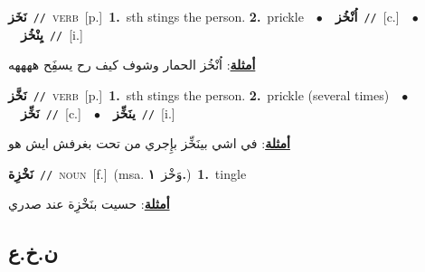 \documentclass[10pt,a4paper,twoside]{article} %
\begin{document}
\begin{multicols}{2}
{\setlength\topsep{0pt}\textbf{\foreignlanguage{arabic}{نَخَز}}\ {\color{gray}\texttt{//}\color{black}}\ \textsc{verb}\ [p.]\ \textbf{1.}~sth stings the person.  \textbf{2.}~prickle\ \ $\bullet$\ \ \setlength\topsep{0pt}\textbf{\foreignlanguage{arabic}{اُنْخُز}}\ {\color{gray}\texttt{//}\color{black}}\ [c.]\ \ $\bullet$\ \ \setlength\topsep{0pt}\textbf{\foreignlanguage{arabic}{يِنْخُز}}\ {\color{gray}\texttt{//}\color{black}}\ [i.]\  \begin{flushright}\color{gray}\foreignlanguage{arabic}{\textbf{\underline{\foreignlanguage{arabic}{أمثلة}}}: اُنْخُز الحمار وشوف كيف رح يسفَِح ههههه}\end{flushright}\color{black}} \vspace{2mm}

{\setlength\topsep{0pt}\textbf{\foreignlanguage{arabic}{نَخَّز}}\ {\color{gray}\texttt{//}\color{black}}\ \textsc{verb}\ [p.]\ \textbf{1.}~sth stings the person.  \textbf{2.}~prickle (several times)\ \ $\bullet$\ \ \setlength\topsep{0pt}\textbf{\foreignlanguage{arabic}{نَخِّز}}\ {\color{gray}\texttt{//}\color{black}}\ [c.]\ \ $\bullet$\ \ \setlength\topsep{0pt}\textbf{\foreignlanguage{arabic}{ينَخِّز}}\ {\color{gray}\texttt{//}\color{black}}\ [i.]\  \begin{flushright}\color{gray}\foreignlanguage{arabic}{\textbf{\underline{\foreignlanguage{arabic}{أمثلة}}}: في اشي بينَخِّز بإِجري من تحت بغرفش ايش هو}\end{flushright}\color{black}} \vspace{2mm}

{\setlength\topsep{0pt}\textbf{\foreignlanguage{arabic}{نَخْزِة}}\ {\color{gray}\texttt{//}\color{black}}\ \textsc{noun}\ [f.]\ \color{gray}(msa. \foreignlanguage{arabic}{وَخْز}~\foreignlanguage{arabic}{\textbf{١.}})\color{black}\ \textbf{1.}~tingle\  \begin{flushright}\color{gray}\foreignlanguage{arabic}{\textbf{\underline{\foreignlanguage{arabic}{أمثلة}}}: حسيت بنَخْزِة عند صدري}\end{flushright}\color{black}} \vspace{2mm}

\vspace{-3mm}
\subsection*{\color{blue}\foreignlanguage{arabic}{ن.خ.ع}\color{blue}{}} 


\end{multicols}
\end{document}
